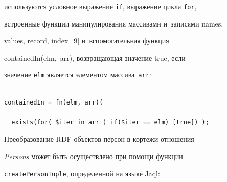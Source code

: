 используются условное выражение \verb"if", выражение цикла \verb"for",

встроенные функции манипулирования массивами и~записями {\sf names},

{\sf values}, {\sf record}, {\sf index}~[9] и~вспомогательная функция\linebreak

\mbox{{\sf containedIn(elm, arr)}}, возвращающая значение {\sf true}, если

значение \verb"elm" является элементом мас\-си\-ва~\verb"arr":

      \begin{verbatim}

containedIn = fn(elm, arr)(

  exists(for( $iter in arr ) if($iter == elm) [true]) );

\end{verbatim}



      Преобразование RDF-объек\-тов персон в кортежи отношения

\textit{Persons} может быть осуществлено при помощи функции

\verb"createPersonTuple", определенной на языке Jaql:

